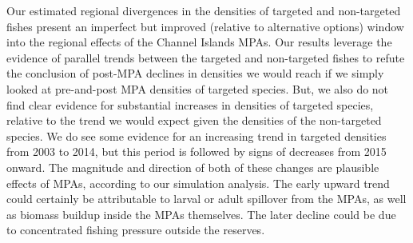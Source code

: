 \documentclass[twoside,12pt,final]{ucthesis-CA2012}
\begin{document}
\begin{ucmainmatter}
Our estimated regional divergences in the densities of targeted and
non-targeted fishes present an imperfect but improved (relative to
alternative options) window into the regional effects of the Channel
Islands MPAs. Our results leverage the evidence of parallel trends
between the targeted and non-targeted fishes to refute the conclusion of
post-MPA declines in densities we would reach if we simply looked at
pre-and-post MPA densities of targeted species. But, we also do not find
clear evidence for substantial increases in densities of targeted
species, relative to the trend we would expect given the densities of
the non-targeted species. We do see some evidence for an increasing
trend in targeted densities from 2003 to 2014, but this period is
followed by signs of decreases from 2015 onward. The magnitude and
direction of both of these changes are plausible effects of MPAs,
according to our simulation analysis. The early upward trend could
certainly be attributable to larval or adult spillover from the MPAs, as
well as biomass buildup inside the MPAs themselves. The later decline
could be due to concentrated fishing pressure outside the reserves.


\end{ucmainmatter}
\end{document}
